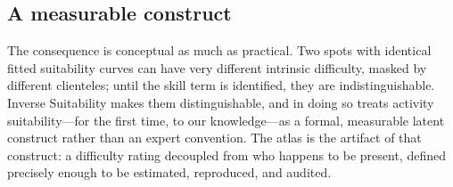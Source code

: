 \subsection{A measurable construct}

The consequence is conceptual as much as practical. Two spots with identical
fitted suitability curves can have very different intrinsic difficulty, masked by
different clienteles; until the skill term is identified, they are
indistinguishable. Inverse Suitability makes them distinguishable, and in doing so
treats activity suitability---for the first time, to our knowledge---as a formal,
measurable latent construct rather than an expert convention. The atlas is the
artifact of that construct: a difficulty rating decoupled from who happens to be
present, defined precisely enough to be estimated, reproduced, and audited.

